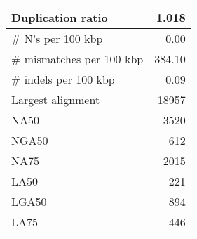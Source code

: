 \documentclass[12pt,a4paper]{article}
\begin{document}
\begin{table}[ht]
\begin{center}
\begin{tabular}{|l*{1}{|r}|}
Duplication ratio & 1.018 \\ \hline
\# N's per 100 kbp & 0.00 \\ \hline
\# mismatches per 100 kbp & 384.10 \\ \hline
\# indels per 100 kbp & 0.09 \\ \hline
Largest alignment & 18957 \\ \hline
NA50 & 3520 \\ \hline
NGA50 & 612 \\ \hline
NA75 & 2015 \\ \hline
LA50 & 221 \\ \hline
LGA50 & 894 \\ \hline
LA75 & 446 \\ \hline
\end{tabular}
\end{center}
\end{table}
\end{document}
